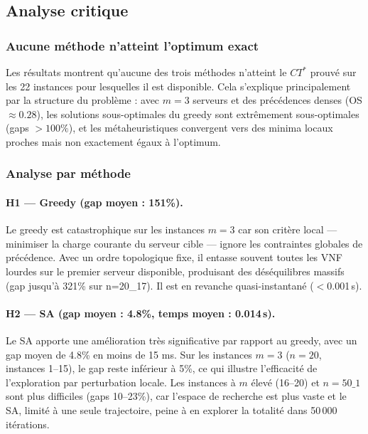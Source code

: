 \documentclass{article}
\begin{document}
\subsection{Analyse critique}

\subsubsection{Aucune méthode n'atteint l'optimum exact}

Les résultats montrent qu'aucune des trois méthodes n'atteint le $CT^*$ prouvé
sur les 22 instances pour lesquelles il est disponible. Cela s'explique
principalement par la structure du problème : avec $m=3$ serveurs et des
précédences denses (OS $\approx 0.28$), les solutions sous-optimales du greedy
sont extrêmement sous-optimales (gaps $>100\%$), et les métaheuristiques
convergent vers des minima locaux proches mais non exactement égaux à l'optimum.

\subsubsection{Analyse par méthode}

\paragraph{H1 --- Greedy (gap moyen : 151\%).}
Le greedy est catastrophique sur les instances $m=3$ car son critère local
--- minimiser la charge courante du serveur cible --- ignore les contraintes
globales de précédence. Avec un ordre topologique fixe, il entasse souvent
toutes les VNF lourdes sur le premier serveur disponible, produisant des
déséquilibres massifs (gap jusqu'à 321\% sur n=20\_17). Il est en revanche
quasi-instantané ($<$0.001\,s).

\paragraph{H2 --- SA (gap moyen : 4.8\%, temps moyen : 0.014\,s).}
Le SA apporte une amélioration très significative par rapport au greedy, avec
un gap moyen de 4.8\% en moins de 15 ms. Sur les instances $m=3$ ($n=20$,
instances 1--15), le gap reste inférieur à 5\%, ce qui illustre l'efficacité
de l'exploration par perturbation locale. Les instances à $m$ élevé (16--20)
et $n=50\_1$ sont plus difficiles (gaps 10--23\%), car l'espace de recherche
est plus vaste et le SA, limité à une seule trajectoire, peine à en explorer
la totalité dans 50\,000 itérations.
\end{document}
